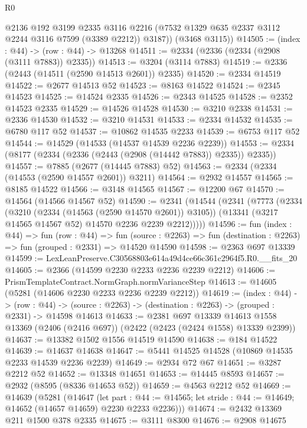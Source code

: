 \begin{lexlean}{R0}
\begin{coremodule}
          @2136
          @192
          @3199
          @2335
          @3116
          @2216
          (@7532 @1329 @635 @2337 @3112 @2244 @3116 @7599 (@3389 @2212))
          @3187))
      (@3468 @3115))
@14505 := (index : @44) -> (row : @44) -> @13268
@14511 := @2334 (@2336 (@2334 (@2908 (@3111 @7883)) @2335))
@14513 := @3204 (@3114 @7883)
@14519 := @2336 (@2443 (@14511 (@2590 @14513 @2601)) @2335)
@14520 := @2334 @14519
@14522 := @2677 @14513 @52
@14523 := @8163 @14522
@14524 := @2345 @14523
@14525 := @14524 @2335
@14526 := @2343 @14525
@14528 := @2352 @14523 @2335
@14529 := @14526 @14528
@14530 := @3210 @2338
@14531 := @2336 @14530
@14532 := @3210 @14531
@14533 := @2334 @14532
@14535 := @6780 @117 @52
@14537 := @10862 @14535 @2233
@14539 := @6753 @117 @52
@14544 := @14529 (@14533 (@14537 @14539 @2236 @2239))
@14553 := @2334 (@8177 (@2334 (@2336 (@2443 (@2908 (@14442 @7883)) @2335)) @2335))
@14557 := @7885 (@2677 (@14445 @7883) @52)
@14563 := @2334 (@2334 (@14553 (@2590 @14557 @2601)) @3211)
@14564 := @2932 @14557
@14565 := @8185 @14522
@14566 := @3148 @14565
@14567 := @12200 @67
@14570 := @14564 (@14566 @14567 @52)
@14590 := @2341
    (@14544
      (@2341
        (@7773
          (@2334
            (@3210 (@2334 (@14563 (@2590 @14570 @2601)) @3105))
            (@13341 (@3217 @14565 @14567 @52) @14570 @2236 @2239 @2212)))))
@14596 := fun (index : @44) =>
  fun (row : @44) =>
  fun (source : @2263) => fun (destination : @2263) => fun (grouped : @2331) => @14520 @14590
@14598 := @2363 @697 @13339
@14599 := LexLeanPreserve.C30568803e614a49d4ce66c361c2964f5.R0.__fits_20
@14605 := @2366 (@14599 @2230 @2233 @2236 @2239 @2212)
@14606 := PrismTemplateContract.NormGraph.normVarianceStep
@14613 := @14605 (@5281 (@14606 @2230 @2233 @2236 @2239 @2212))
@14619 := (index : @44) ->
  (row : @44) -> (source : @2263) -> (destination : @2263) -> (grouped : @2331) -> @14598 @14613
@14633 := @2381
    @697
    @13339
    @14613
    @1558
    @13369
    (@2406 (@2416 @697))
    (@2422 (@2423 (@2424 @1558) @13339 @2399))
@14637 := @13382 @1502 @1556 @14519 @14590
@14638 := @184 @14522
@14639 := @14637 @14638
@14647 := @5441 @14525 @14528 (@10869 @14535 @2233 @14539 @2236 @2239)
@14649 := @2934 @72 @67
@14651 := @3287 @2212 @52
@14652 := @13348 @14651
@14653 := @14445 @8593
@14657 := @2932 (@8595 (@8336 @14653 @52))
@14659 := @4563 @2212 @52
@14669 := @14639
    (@5281
      (@14647
        (let part : @44 := @14565;
        let stride : @44 := @14649; @14652 (@14657 @14659) @2230 @2233 @2236)))
@14674 := @2432 @13369 @211 @1500 @378 @2335
@14675 := @3111 @8300
@14676 := @2908 @14675

\end{coremodule}
\end{lexlean}
